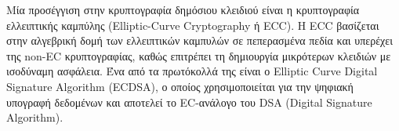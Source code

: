  Μία προσέγγιση στην κρυπτογραφία δημόσιου κλειδιού είναι η κρυπτογραφία ελλειπτικής καμπύλης (Elliptic-Curve Cryptography ή ECC). Η ECC βασίζεται στην αλγεβρική δομή των ελλειπτικών καμπυλών σε πεπερασμένα πεδία και υπερέχει της non-EC κρυπτογραφίας, καθώς επιτρέπει τη δημιουργία μικρότερων κλειδιών με ισοδύναμη ασφάλεια. Ένα από τα πρωτόκολλά της είναι ο Elliptic Curve Digital Signature Algorithm (ECDSA), ο οποίος χρησιμοποιείται για την ψηφιακή υπογραφή δεδομένων και αποτελεί το EC-ανάλογο του DSA (Digital Signature Algorithm)\cite{2.2-ecdsa}.